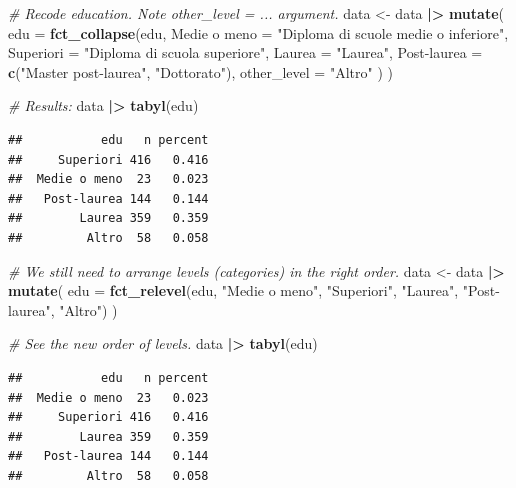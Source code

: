 \documentclass[
]{book}
\newenvironment{Shaded}{\begin{snugshade}}{\end{snugshade}}
\newcommand{\AttributeTok}[1]{\textcolor[rgb]{0.13,0.29,0.53}{#1}}
\newcommand{\CommentTok}[1]{\textcolor[rgb]{0.56,0.35,0.01}{\textit{#1}}}
\newcommand{\FunctionTok}[1]{\textcolor[rgb]{0.13,0.29,0.53}{\textbf{#1}}}
\newcommand{\NormalTok}[1]{#1}
\newcommand{\OtherTok}[1]{\textcolor[rgb]{0.56,0.35,0.01}{#1}}
\newcommand{\SpecialCharTok}[1]{\textcolor[rgb]{0.81,0.36,0.00}{\textbf{#1}}}
\newcommand{\StringTok}[1]{\textcolor[rgb]{0.31,0.60,0.02}{#1}}
\begin{document}
\begin{Shaded}
\begin{Highlighting}[]
\CommentTok{\# Recode education. Note other\_level = ... argument.}
\NormalTok{data }\OtherTok{\textless{}{-}}\NormalTok{ data }\SpecialCharTok{|\textgreater{}} 
  \FunctionTok{mutate}\NormalTok{(}
    \AttributeTok{edu =} \FunctionTok{fct\_collapse}\NormalTok{(edu,}
      \StringTok{\textasciigrave{}}\AttributeTok{Medie o meno}\StringTok{\textasciigrave{}} \OtherTok{=} \StringTok{"Diploma di scuole medie o inferiore"}\NormalTok{,}
      \AttributeTok{Superiori =} \StringTok{"Diploma di scuola superiore"}\NormalTok{,}
      \AttributeTok{Laurea =} \StringTok{"Laurea"}\NormalTok{,}
      \StringTok{\textasciigrave{}}\AttributeTok{Post{-}laurea}\StringTok{\textasciigrave{}} \OtherTok{=} \FunctionTok{c}\NormalTok{(}\StringTok{"Master post{-}laurea"}\NormalTok{, }\StringTok{"Dottorato"}\NormalTok{), }
      \AttributeTok{other\_level =} \StringTok{"Altro"}
\NormalTok{    )}
\NormalTok{  )}

\CommentTok{\# Results:}
\NormalTok{data }\SpecialCharTok{|\textgreater{}} 
  \FunctionTok{tabyl}\NormalTok{(edu)}
\end{Highlighting}
\end{Shaded}

\begin{verbatim}
##           edu   n percent
##     Superiori 416   0.416
##  Medie o meno  23   0.023
##   Post-laurea 144   0.144
##        Laurea 359   0.359
##         Altro  58   0.058
\end{verbatim}

\begin{Shaded}
\begin{Highlighting}[]
\CommentTok{\# We still need to arrange levels (categories) in the right order.}
\NormalTok{data }\OtherTok{\textless{}{-}}\NormalTok{ data }\SpecialCharTok{|\textgreater{}} 
  \FunctionTok{mutate}\NormalTok{(}
    \AttributeTok{edu =} \FunctionTok{fct\_relevel}\NormalTok{(edu, }\StringTok{"Medie o meno"}\NormalTok{, }\StringTok{"Superiori"}\NormalTok{, }\StringTok{"Laurea"}\NormalTok{, }\StringTok{"Post{-}laurea"}\NormalTok{, }\StringTok{"Altro"}\NormalTok{)}
\NormalTok{  )}

\CommentTok{\# See the new order of levels.}
\NormalTok{data }\SpecialCharTok{|\textgreater{}} 
  \FunctionTok{tabyl}\NormalTok{(edu)}
\end{Highlighting}
\end{Shaded}

\begin{verbatim}
##           edu   n percent
##  Medie o meno  23   0.023
##     Superiori 416   0.416
##        Laurea 359   0.359
##   Post-laurea 144   0.144
##         Altro  58   0.058
\end{verbatim}
\end{document}
